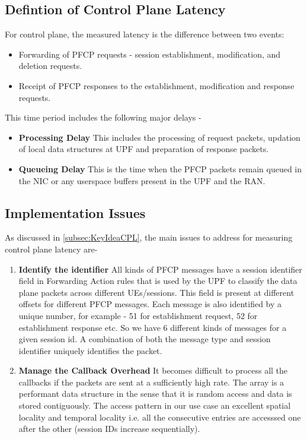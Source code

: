 \subsection{Defintion of Control Plane Latency}
For control plane, the measured latency is the difference between two events:
\begin{itemize}
	\item Forwarding of PFCP requests - session establishment, modification, and deletion requests.
	\item Receipt of PFCP responses to the establishment, modification and response requests.
\end{itemize}
This time period includes the following major delays -
\begin{itemize}
	\item \textbf{Processing Delay} This includes the processing of request packets, updation of local data structures at UPF and preparation of response packets.
	\item \textbf{Queueing Delay} This is the time when the PFCP packets remain queued in the NIC or any userspace buffers present in the UPF and the RAN.
\end{itemize}

\subsection{Implementation Issues}
As discussed in \ref{subsec:KeyIdeaCPL}, the main issues to address for measuring control plane latency are-
\begin{enumerate}
	\item \textbf{Identify the identifier}
	      All kinds of PFCP messages have a session identifier field in Forwarding
	      Action rules that is used by the UPF to classify the data plane packets across different UEs/sessions. This field is present at different offsets for different PFCP messages. Each message is also identified by a unique number, for example - 51 for establishment request, 52 for establishment response etc. So we have  6 different kinds of messages for a given session id. A combination of both the message type and session identifier uniquely identifies the packet.
	\item \textbf{Manage the Callback Overhead} It becomes difficult to 
	process all the callbacks if the packets are sent at a sufficiently high
	 rate. The array is a performant data structure in the sense that it is
	  random access and data is stored contiguously. The access pattern in our use case an excellent spatial locality and temporal locality i.e. all the consecutive entries are accesssed one after the other (session IDs increase sequentially).
\end{enumerate}


